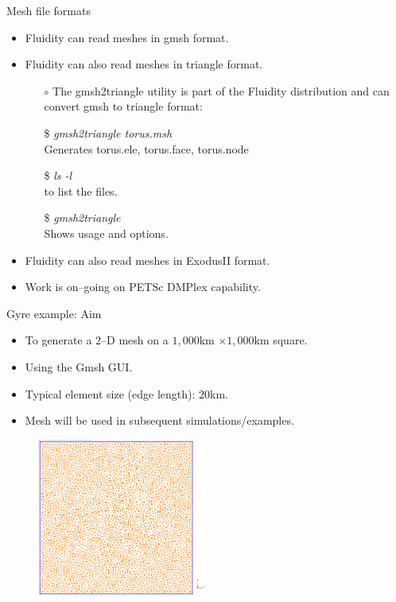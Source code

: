 \documentclass[t]{beamer}
\begin{document}
\begin{frame}{Mesh file formats}
   \begin{itemize}
      \item Fluidity can read meshes in gmsh format.\vspace{10pt}
      \item Fluidity can also read meshes in triangle format.
      \begin{itemize}
         \item[$\circ$] The gmsh2triangle utility is part of the Fluidity distribution and can convert gmsh to triangle format:
         \item[\$] \emph{gmsh2triangle torus.msh} \\ \hspace{10pt} Generates torus.ele, torus.face, torus.node
         \item[\$] \emph{ls -l} \\ \hspace{10pt} to list the files.
         \item[\$] \emph{gmsh2triangle} \\ \hspace{10pt} Shows usage and options.\vspace{10pt}
      \end{itemize}
      \item Fluidity can also read meshes in ExodusII format.\vspace{10pt}
      \item Work is on--going on PETSc DMPlex capability.
   \end{itemize}
\end{frame}

\begin{frame}{Gyre example: Aim}

\begin{itemize}
    \item To generate a 2--D mesh on a $1,000$km $\times 1,000$km square.
    \item Using the Gmsh GUI.
    \item Typical element size (edge length): $20$km.
    \item Mesh will be used in subsequent simulations/examples.
\end{itemize}

\begin{figure}[htbp]
 \centering
  \includegraphics[width=0.5\textwidth]{../figures/2d-example-mesh}
\end{figure}

\end{frame}
\end{document}
